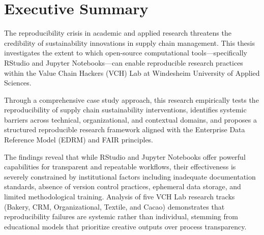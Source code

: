 \documentclass[
  oneside,
  open=any]{scrbook}
\renewcommand*\contentsname{Table of contents}
\newcommand\contentsname{Table of contents}
\begin{document}
\begin{frontmatter}
\begin{titlepage}
\begin{minipage}[b][\textheight][s]{\minipagewidth}
\authorblock

\affiliationblock

\vfill

\logoblock

\footerblock
\par

\end{minipage}
\clearpage
\restoregeometry
\end{titlepage}
\setcounter{page}{1}
\end{frontmatter}


\renewcommand*\contentsname{Table of contents}
{
\setcounter{tocdepth}{2}
\tableofcontents
}
\listoffigures
\listoftables

\mainmatter
\chapter*{Executive Summary}\label{executive-summary}

The reproducibility crisis in academic and applied research threatens
the credibility of sustainability innovations in supply chain
management. This thesis investigates the extent to which open-source
computational tools---specifically RStudio and Jupyter Notebooks---can
enable reproducible research practices within the Value Chain Hackers
(VCH) Lab at Windesheim University of Applied Sciences.

Through a comprehensive case study approach, this research empirically
tests the reproducibility of supply chain sustainability interventions,
identifies systemic barriers across technical, organizational, and
contextual domains, and proposes a structured reproducible research
framework aligned with the Enterprise Data Reference Model (EDRM) and
FAIR principles.

The findings reveal that while RStudio and Jupyter Notebooks offer
powerful capabilities for transparent and repeatable workflows, their
effectiveness is severely constrained by institutional factors including
inadequate documentation standards, absence of version control
practices, ephemeral data storage, and limited methodological training.
Analysis of five VCH Lab research tracks (Bakery, CRM, Organizational,
Textile, and Cacao) demonstrates that reproducibility failures are
systemic rather than individual, stemming from educational models that
prioritize creative outputs over process transparency.
\end{document}
